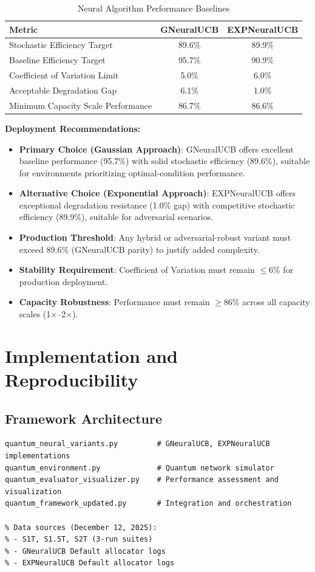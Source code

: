 \documentclass[12pt,a4paper]{article}
\begin{document}
\begin{table}[H]
\centering
\caption{Neural Algorithm Performance Baselines}
\begin{tabular}{@{}lcc@{}}
\toprule
\textbf{Metric} & \textbf{GNeuralUCB} & \textbf{EXPNeuralUCB} \\
\midrule
Stochastic Efficiency Target & 89.6\% & 89.9\% \\
Baseline Efficiency Target & 95.7\% & 90.9\% \\
Coefficient of Variation Limit & 5.0\% & 6.0\% \\
Acceptable Degradation Gap & 6.1\% & 1.0\% \\
Minimum Capacity Scale Performance & 86.7\% & 86.6\% \\
\bottomrule
\end{tabular}
\end{table}

\textbf{Deployment Recommendations:}
\begin{itemize}
\item \textbf{Primary Choice (Gaussian Approach)}: GNeuralUCB offers excellent baseline performance (95.7\%) with solid stochastic efficiency (89.6\%), suitable for environments prioritizing optimal-condition performance.
\item \textbf{Alternative Choice (Exponential Approach)}: EXPNeuralUCB offers exceptional degradation resistance (1.0\% gap) with competitive stochastic efficiency (89.9\%), suitable for adversarial scenarios.
\item \textbf{Production Threshold}: Any hybrid or adversarial-robust variant must exceed 89.6\% (GNeuralUCB parity) to justify added complexity.
\item \textbf{Stability Requirement}: Coefficient of Variation must remain $\leq$6\% for production deployment.
\item \textbf{Capacity Robustness}: Performance must remain $\geq$86\% across all capacity scales (1$\times$--2$\times$).
\end{itemize}

\section{Implementation and Reproducibility}

\subsection{Framework Architecture}
\begin{lstlisting}[caption=Core Neural Framework Components]
quantum_neural_variants.py         # GNeuralUCB, EXPNeuralUCB implementations
quantum_environment.py             # Quantum network simulator
quantum_evaluator_visualizer.py    # Performance assessment and visualization
quantum_framework_updated.py       # Integration and orchestration

% Data sources (December 12, 2025):
% - S1T, S1.5T, S2T (3-run suites)
% - GNeuralUCB Default allocator logs
% - EXPNeuralUCB Default allocator logs
\end{lstlisting}
\end{document}
